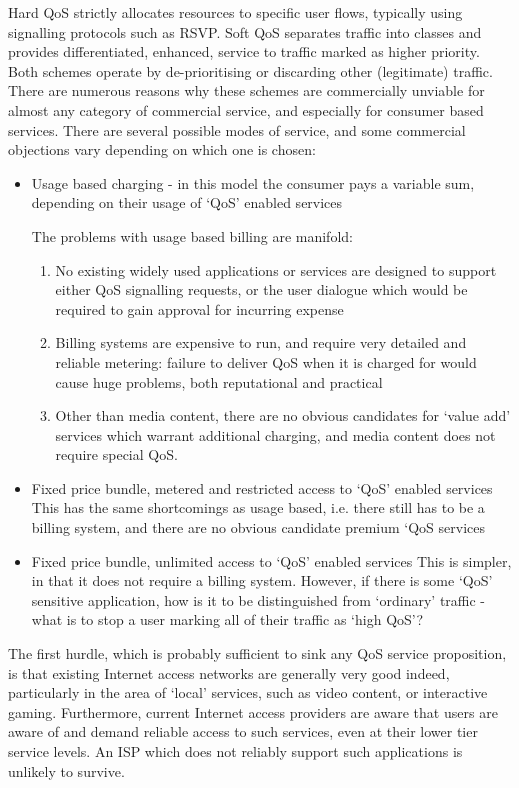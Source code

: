Hard QoS strictly allocates resources to specific user flows, typically using signalling protocols such as RSVP.
Soft QoS separates traffic into classes and provides differentiated, enhanced, service to traffic marked as higher priority.
Both schemes operate by de-prioritising or discarding other (legitimate) traffic.
There are numerous reasons why these schemes are commercially unviable for almost any category of commercial service, and especially for consumer based services.
There are several possible modes of service, and some commercial objections vary depending on which one is chosen:
\begin{itemize}
	\item Usage based charging - in this model the consumer pays a variable sum, depending on their usage of ‘QoS’ enabled services

	      The problems with usage based billing are manifold:
	      \begin{enumerate}
		      \item No existing widely used applications or services are designed to support either QoS signalling requests, or the user dialogue which would be required to gain approval for incurring expense
		      \item Billing systems are expensive to run, and require very detailed and reliable metering: failure to deliver QoS when it is charged for would cause huge problems, both reputational and practical
		      \item Other than media content, there are no obvious candidates for ‘value add’ services which warrant additional charging, and media content does not require special QoS.
	      \end{enumerate}
	\item Fixed price bundle, metered and restricted access to ‘QoS’ enabled services
	      This has the same shortcomings as usage based, i.e. there still has to be a billing system, and there are no obvious candidate premium ‘QoS services

	\item Fixed price bundle, unlimited access to ‘QoS’ enabled services
	      This is simpler, in that it does not require a billing system.
	      However, if there is some ‘QoS’ sensitive application, how is it to be distinguished from ‘ordinary’ traffic - what is to stop a user marking all of their traffic as ‘high QoS’?

\end{itemize}
The first hurdle, which is probably sufficient to sink any QoS service proposition, is that existing Internet access networks are generally very good indeed, particularly in the area of ‘local’ services, such as video content, or interactive gaming.
Furthermore, current Internet access providers are aware that users are aware of and demand reliable access to such services, even at their lower tier service levels.
An ISP which does not reliably support such applications is unlikely to survive.

